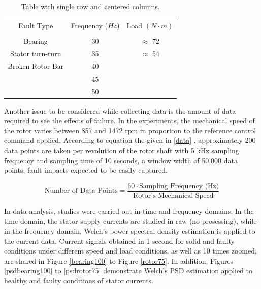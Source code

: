 \begin{table}[h]
	{\setlength{\tabcolsep}{12pt}
		\caption{Table with single row and centered columns.}
		\begin{center}
			\vspace{-6mm}
			\begin{tabular}{ccc}
				\hline \\[-2.45ex] \hline \\[-2.1ex]
				Fault Type & Frequency ($Hz$) & Load $(N\cdot m)$ \\
				\hline \\[-1.8ex]
				Bearing & 30 & $\approx$ 72  \\
				Stator turn-turn & 35 & $\approx$ 54  \\
				Broken Rotor Bar & 40 &  \\
				& 45 &   \\
				& 50 &   \\
				\hline
			\end{tabular}
			\vspace{-6mm}
		\end{center}
		\label{Table3.3}}
\end{table}

Another issue to be considered while collecting data is the amount of data required to see the effects of failure. In the experiments, the mechanical speed of the rotor varies between 857 and 1472 rpm in proportion to the reference control command applied. According to equation the given in \ref{data} \cite{shenfield2020novel}, approximately 200 data points are taken per revolution of the rotor shaft with 5 kHz sampling frequency and sampling time of 10 seconds, a window width of 50,000 data points, fault impacts expected to be easily captured.

\begin{equation}
	\text{Number of Data Points} = \displaystyle \frac{60 \cdot \text{Sampling Frequency (Hz)}}{\text{Rotor's Mechanical Speed}}
	\label{data}
\end{equation}

In data analysis, studies were carried out in time and frequency domains. In the time domain, the stator supply currents are studied in raw (no-prosessing), while in the frequency domain, Welch's power spectral density estimation is applied to the current data. Current signals obtained in 1 second for solid and faulty conditions under different speed and load conditions, as well as 10 times zoomed, are shared in Figure \ref{bearing100} to Figure \ref{rotor75}. In addition, Figures \ref{psdbearing100} to \ref{psdrotor75} demonstrate Welch's PSD estimation applied to healthy and faulty conditions of stator currents.

